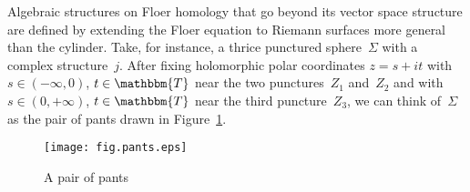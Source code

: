 \documentclass[12pt,twoside]{amsart}
\theoremstyle{plain}
\numberwithin{figure}{section}
\numberwithin{equation}{section}
\def\TT{\mathbbm{T}}
\begin{document}
Algebraic structures on Floer homology that go beyond its vector space structure
are defined by extending the Floer equation to Riemann surfaces more general than 
the cylinder. 
Take, for instance, a thrice punctured sphere~$\Sigma$ with a complex structure~$j$. 
After fixing holomorphic polar coordinates $z = s+it$ with $s \in (-\infty,0)$, $t \in \TT$ 
near the two punctures~$Z_1$ and~$Z_2$ and with $s \in (0,+\infty)$, $t \in \TT$ near the third 
puncture~$Z_3$, we can think of~$\Sigma$ as the pair of pants drawn in Figure~\ref{fig.pants}. 


%
\begin{figure}[h]   
 \begin{center}
  \leavevmode\texttt{[image: fig.pants.eps]}
 \end{center}
 \caption{A pair of pants}  \label{fig.pants}
\end{figure}
\end{document}
